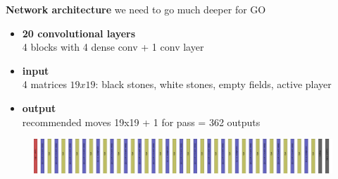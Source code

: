 \documentclass[xcolor=dvipsnames]{beamer}
\begin{document}
\begin{frame}{\bf Network architecture}
we need to go much deeper for GO
\begin{itemize}
  \item {\bf 20 convolutional layers} \\ 4 blocks with 4 dense conv + 1 conv layer
  \item {\bf input} \\ 4 matrices $19x19$: black stones, white stones, empty fields, active player
  \item {\bf output} \\ recommended moves 19x19 + 1 for pass = 362 outputs

\end{itemize}

  \begin{figure}[!htb]
    \centering
    \includegraphics[scale=0.049]{../../pictures/go_deep_cnn_architecture.png}
  \end{figure}

\end{frame}
\end{document}
